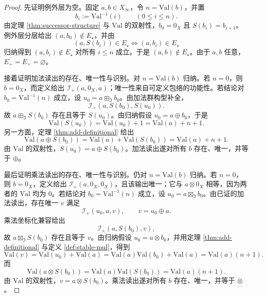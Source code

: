 \begin{proof}
先证明例外层为空。固定 $a,b\in X_\infty$，令 $n=\mathrm{Val}(b)$，并置
\[
b_i:=\mathrm{Val}^{-1}(i)\qquad(0\le i\le n).
\]
由定理 \ref{thm:successor-structure} 与 $\mathrm{Val}$ 的双射性，$b_0=0_X$ 且 $S(b_i)=b_{i+1}$。例外层分层给出 $(a,b_0)\notin E_\star$，并由
\[
(a,S(b_i))\in E_\star\Longleftrightarrow (a,b_i)\in E_\star
\]
归纳得到 $(a,b_i)\notin E_\star$ 对所有 $i\le n$ 成立。于是 $(a,b)\notin E_\star$。由于 $a,b$ 任意，$E_+=E_\times=\varnothing$。

接着证明加法读出的存在、唯一性与识别。对 $n=\mathrm{Val}(b)$ 归纳。若 $n=0$，则 $b=0_X$，而定义给出 $\mathcal I_+(a,0_X,a)$；唯一性来自可定义包络的功能性。若结论对 $b_0=\mathrm{Val}^{-1}(n)$ 成立，设 $u_0=a\boxplus_{\mathfrak I} b_0$。由加法群构型补全，
\[
\mathcal I_+(a,S(b_0),S(u_0)).
\]
故 $a\boxplus_{\mathfrak I}S(b_0)$ 存在且等于 $S(u_0)$。由归纳假设 $u_0=a\oplus b_0$，于是
\[
\mathrm{Val}(S(u_0))=\mathrm{Val}(u_0)+1
=\mathrm{Val}(a)+n+1.
\]
另一方面，定理 \ref{thm:add-definitional} 给出
\[
\mathrm{Val}(a\oplus S(b_0))=\mathrm{Val}(a)+\mathrm{Val}(S(b_0))=\mathrm{Val}(a)+n+1.
\]
由 $\mathrm{Val}$ 的双射性，$S(u_0)=a\oplus S(b_0)$。加法读出遂对所有 $b$ 存在、唯一，并等于 $\oplus$。

最后证明乘法读出的存在、唯一性与识别。仍对 $n=\mathrm{Val}(b)$ 归纳。若 $n=0$，则 $b=0_X$，定义给出 $\mathcal I_\times(a,0_X,0_X)$，且该输出唯一；它与 $a\otimes0_X$ 相等，因为两者的 $\mathrm{Val}$ 均为 $0$。若结论对 $b_0=\mathrm{Val}^{-1}(n)$ 成立，设 $u_0=a\boxtimes_{\mathfrak I}b_0$。由已证的加法读出，存在唯一 $v$ 满足
\[
\mathcal I_+(u_0,a,v),
\qquad
v=u_0\oplus a.
\]
乘法坐标化兼容给出
\[
\mathcal I_\times(a,S(b_0),v),
\]
故 $a\boxtimes_{\mathfrak I}S(b_0)$ 存在且等于 $v$。由归纳假设 $u_0=a\otimes b_0$，并用定理 \ref{thm:add-definitional} 与定义 \ref{def:stable-mul}，得到
\[
\mathrm{Val}(v)=\mathrm{Val}(u_0)+\mathrm{Val}(a)
=\mathrm{Val}(a)\mathrm{Val}(b_0)+\mathrm{Val}(a)
=\mathrm{Val}(a)(n+1).
\]
而
\[
\mathrm{Val}(a\otimes S(b_0))
=\mathrm{Val}(a)\mathrm{Val}(S(b_0))
=\mathrm{Val}(a)(n+1).
\]
由 $\mathrm{Val}$ 的双射性，$v=a\otimes S(b_0)$。乘法读出遂对所有 $b$ 存在、唯一，并等于 $\otimes$。
\end{proof}

